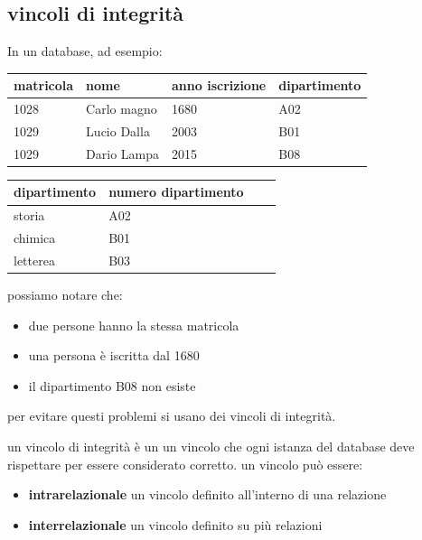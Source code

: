 \documentclass{article}
\begin{document}
    \subsection{vincoli di integrità}
        In un database, ad esempio:

        \begin{table}[h]
            \centering

            \begin{tabular}{|l|l|l|l|}
                \hline
                    matricola & nome & anno iscrizione & dipartimento \\ \hline
                    1028 & Carlo magno & 1680 & A02 \\ \hline
                    1029 & Lucio Dalla & 2003 & B01 \\ \hline
                    1029 & Dario Lampa & 2015 & B08 \\ \hline
            \end{tabular}

        \hfill

            \begin{tabular}{|l|l|l|l|}
                \hline
                    dipartimento &numero dipartimento \\ \hline
                    storia& A02 \\ \hline
                    chimica& B01 \\ \hline
                    letterea& B03 \\ \hline
            \end{tabular}

        \end{table}
        possiamo notare che:
        \begin{itemize}
            \item due persone hanno la stessa matricola
            \item una persona è iscritta dal 1680
            \item il dipartimento B08 non esiste
        \end{itemize}
        per evitare questi problemi si usano dei vincoli di integrità.

        \begin{tcolorbox}[colback= green!10!white, colframe= green!40!black, title=vincoli di integrità]

            un vincolo di integrità è un un vincolo che ogni istanza del database deve rispettare per essere considerato corretto.
            un vincolo può essere:
            \begin{itemize}
                \item \textbf{intrarelazionale}
                    un vincolo definito all'interno di una relazione
                
                \item \textbf{interrelazionale}
                    un vincolo definito su più relazioni
            \end{itemize}

        \end{tcolorbox}
\end{document}
